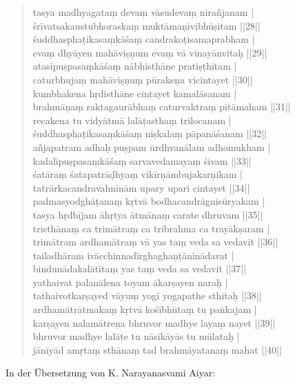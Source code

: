 \documentclass[a4paper,12pt]{article}
\begin{document}
\begin{quote}
tasya madhyagataṃ devaṃ vāsudevaṃ nirañjanam |\\
śrīvatsakaustubhoraskaṃ muktāmaṇivibhūṣitam ||28||\\
śuddhasphaṭikasaṃkāśaṃ candrakoṭisamaprabham |\\
evaṃ dhyāyen mahāviṣṇum evaṃ vā vinayānvitaḥ ||29||\\
atasīpuṣpasaṃkāśaṃ nābhisthāne pratiṣṭhitam |\\
caturbhujaṃ mahāviṣṇuṃ pūrakeṇa vicintayet ||30||\\
kumbhakena hṛdisthāne cintayet kamalāsanam |\\
brahmāṇaṃ raktagaurābhaṃ caturvaktraṃ pitāmaham ||31||\\
recakena tu vidyātmā lalāṭasthaṃ trilocanam |\\
śuddhasphaṭikasaṃkāśaṃ niṣkalaṃ pāpanāśanam ||32||\\
añjapatram adhaḥ puṣpam ūrdhvanālam adhomukham |\\
kadalīpuṣpasaṃkāśaṃ sarvavedamayaṃ śivam ||33||\\
śatāraṃ śatapatrāḍhyaṃ vikīrṇāmbujakarṇikam |\\
tatrārkacandravahnīnām upary upari cintayet ||34||\\
padmasyodghāṭanaṃ kṛtvā bodhacandrāgnisūryakam |\\
tasya hṛdbījam āhṛtya ātmānaṃ carate dhruvam ||35||\\
tristhānaṃ ca trimātraṃ ca tribrahma ca trayākṣaram |\\
trimātram ardhamātraṃ vā yas taṃ veda sa vedavit ||36||\\
tailadhāram ivācchinnadīrghaghaṇṭāninādavat |\\
bindunādakalātītaṃ yas taṃ veda sa vedavit ||37||\\
yathaivat palanālena toyam ākarṣayen naraḥ |\\
tathaivotkarṣayed vāyuṃ yogī yogapathe sthitaḥ ||38||\\
ardhamātrātmakaṃ kṛtvā kośībhūtaṃ tu paṅkajam |\\
karṣayen nalamātreṇa bhruvor madhye layaṃ nayet ||39||\\
bhruvor madhye lalāṭe tu nāsikāyās tu mūlataḥ |\\
jānīyād amṛtaṃ sthānaṃ tad brahmāyatanaṃ mahat ||40||\\
\parencite[3]{dhyanabindu}
\end{quote}

In der Übersetzung von K. Narayanasvami Aiyar:
\end{document}
